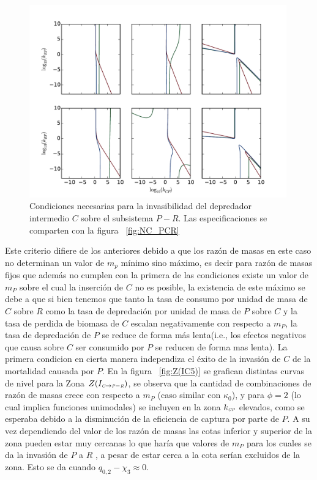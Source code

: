 \begin{figure}
  \centering
  \includegraphics[width = 0.99\textwidth]{./Plots/NecessityCPR.pdf}
  \caption[Condiciones Necesarias $C \to P-R$]{Condiciones necesarias para la invasibilidad del depredador intermedio $C$ sobre el subsistema $P-R$. Las especificaciones se comparten con la figura ~\ref{fig:NC_PCR}}
  \label{fig:NC_CPR}
\end{figure}


Este criterio difiere de los anteriores debido a que los raz\'on de masas en este caso no determinan un valor de $m_p$ m\'inimo sino m\'aximo, es decir para raz\'on de masas fijos que adem\'as no cumplen con la primera de las condiciones existe un valor de $m_P$ sobre el cual la inserci\'on de $C$ no es posible, la existencia de este m\'aximo se debe a que si bien tenemos que tanto la tasa de consumo por unidad de masa de $C$ sobre $R$ como la tasa de depredaci\'on por unidad de masa de $P$ sobre $C$ y la tasa de perdida de biomasa de $C$ escalan negativamente con respecto a $m_P$, la tasa de depredaci\'on de $P$ se reduce de forma m\'as lenta(i.e., los efectos negativos que causa sobre $C$ ser consumido por $P$ se reducen de forma mas lenta). La primera condicion en cierta manera independiza el \'exito de la invasi\'on de $C$ de la mortalidad causada por $P$. En la figura ~\ref{fig:Z(IC5)} se grafican distintas curvas de nivel para la Zona $Z(I_{\textit{\tiny C} \to \textit{\tiny P}-\textit{\tiny R}})$, se observa que la cantidad de combinaciones de raz\'on de masas crece con respecto a $m_P$ (caso similar con $\kappa_0$), y para $\phi = 2$ (lo cual implica funciones unimodales) se incluyen en la zona $k_{\textit{\tiny CP}}$ elevados, como se esperaba debido a la disminuci\'on de la eficiencia de captura por parte de $P$. A su vez dependiendo del valor de los raz\'on de masas las cotas inferior y superior de la zona pueden estar muy cercanas lo que har\'ia que valores de $m_P$ para los cuales se da la invasi\'on de $P$ a $R$ , a pesar de estar cerca a la cota ser\'ian excluidos de la zona. Esto se da cuando $ q_{0,2} - \chi_3 \approx 0$.



